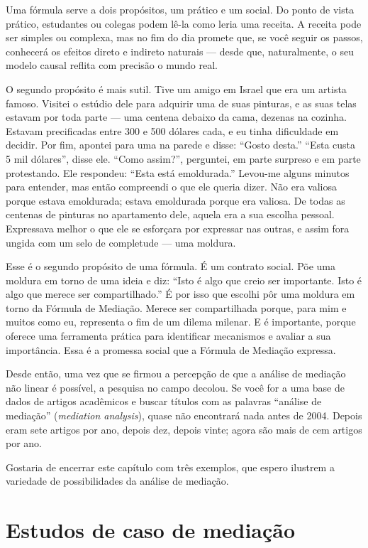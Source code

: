 \documentclass[11pt,a5paper,twoside]{book}
\begin{document}
Uma fórmula serve a dois propósitos, um prático e um social. Do ponto de vista prático, estudantes ou colegas podem lê-la como leria uma receita. A receita pode ser simples ou complexa, mas no fim do dia promete que, se você seguir os passos, conhecerá os efeitos direto e indireto naturais — desde que, naturalmente, o seu modelo causal reflita com precisão o mundo real.

O segundo propósito é mais sutil. Tive um amigo em Israel que era um artista famoso. Visitei o estúdio dele para adquirir uma de suas pinturas, e as suas telas estavam por toda parte — uma centena debaixo da cama, dezenas na cozinha. Estavam precificadas entre 300 e 500 dólares cada, e eu tinha dificuldade em decidir. Por fim, apontei para uma na parede e disse: “Gosto desta.” “Esta custa 5 mil dólares”, disse ele. “Como assim?”, perguntei, em parte surpreso e em parte protestando. Ele respondeu: “Esta está emoldurada.” Levou-me alguns minutos para entender, mas então compreendi o que ele queria dizer. Não era valiosa porque estava emoldurada; estava emoldurada porque era valiosa. De todas as centenas de pinturas no apartamento dele, aquela era a sua escolha pessoal. Expressava melhor o que ele se esforçara por expressar nas outras, e assim fora ungida com um selo de completude — uma moldura.

Esse é o segundo propósito de uma fórmula. É um contrato social. Põe uma moldura em torno de uma ideia e diz: “Isto é algo que creio ser importante. Isto é algo que merece ser compartilhado.” É por isso que escolhi pôr uma moldura em torno da Fórmula de Mediação. Merece ser compartilhada porque, para mim e muitos como eu, representa o fim de um dilema milenar. E é importante, porque oferece uma ferramenta prática para identificar mecanismos e avaliar a sua importância. Essa é a promessa social que a Fórmula de Mediação expressa.

Desde então, uma vez que se firmou a percepção de que a análise de mediação não linear é possível, a pesquisa no campo decolou. Se você for a uma base de dados de artigos acadêmicos e buscar títulos com as palavras “análise de mediação” (\textit{mediation analysis}), quase não encontrará nada antes de 2004. Depois eram sete artigos por ano, depois dez, depois vinte; agora são mais de cem artigos por ano.

Gostaria de encerrar este capítulo com três exemplos, que espero ilustrem a variedade de possibilidades da análise de mediação.

\section{Estudos de caso de mediação}
\end{document}
